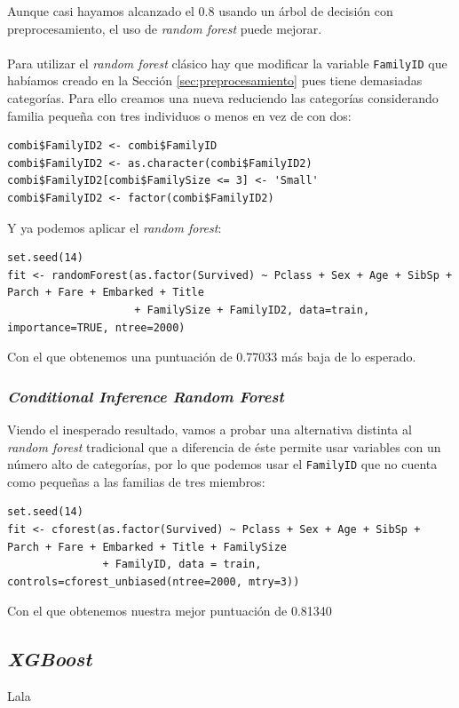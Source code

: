 Aunque casi hayamos alcanzado el 0.8 usando un árbol de decisión con preprocesamiento, el uso de \textit{random forest} puede mejorar.
\\ \\
Para utilizar el \textit{random forest} clásico hay que modificar la variable \texttt{FamilyID} que habíamos creado en la Sección \ref{sec:preprocesamiento} pues tiene demasiadas categorías. Para ello creamos una nueva reduciendo las categorías considerando familia pequeña con tres individuos o menos en vez de con dos:

\begin{lstlisting}[style=R]
combi$FamilyID2 <- combi$FamilyID
combi$FamilyID2 <- as.character(combi$FamilyID2)
combi$FamilyID2[combi$FamilySize <= 3] <- 'Small'
combi$FamilyID2 <- factor(combi$FamilyID2)
\end{lstlisting}

Y ya podemos aplicar el \textit{random forest}:

\begin{lstlisting}[style=R]
set.seed(14)
fit <- randomForest(as.factor(Survived) ~ Pclass + Sex + Age + SibSp + Parch + Fare + Embarked + Title
                    + FamilySize + FamilyID2, data=train, importance=TRUE, ntree=2000)
\end{lstlisting}

Con el que obtenemos una puntuación de 0.77033 más baja de lo esperado.

\subsubsection{\textit{Conditional Inference Random Forest}}

Viendo el inesperado resultado, vamos a probar una alternativa distinta al \textit{random forest} tradicional que a diferencia de éste permite usar variables con un número alto de categorías, por lo que podemos usar el \texttt{FamilyID} que no cuenta como pequeñas a las familias de tres miembros:

\begin{lstlisting}[style=R]
set.seed(14)
fit <- cforest(as.factor(Survived) ~ Pclass + Sex + Age + SibSp + Parch + Fare + Embarked + Title + FamilySize
               + FamilyID, data = train, controls=cforest_unbiased(ntree=2000, mtry=3)) 

\end{lstlisting}

Con el que obtenemos nuestra mejor puntuación de 0.81340

\subsection{\textit{XGBoost}}

Lala



\newpage


